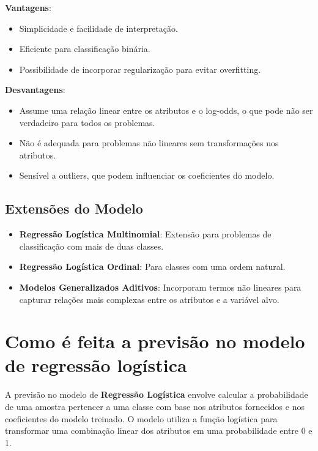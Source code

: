 \documentclass{sciposter}
\begin{document}
\begin{multicols}{3}
\textbf{Vantagens}:

\begin{itemize}
    \item Simplicidade e facilidade de interpretação.
    \item Eficiente para classificação binária.
    \item Possibilidade de incorporar regularização para evitar overfitting.
\end{itemize}

\textbf{Desvantagens}:

\begin{itemize}
    \item Assume uma relação linear entre os atributos e o log-odds, o que pode não ser verdadeiro para todos os problemas.
    \item Não é adequada para problemas não lineares sem transformações nos atributos.
    \item Sensível a outliers, que podem influenciar os coeficientes do modelo.
\end{itemize}

\subsection{Extensões do Modelo}

\begin{itemize}
    \item \textbf{Regressão Logística Multinomial}: Extensão para problemas de classificação com mais de duas classes.
    \item \textbf{Regressão Logística Ordinal}: Para classes com uma ordem natural.
    \item \textbf{Modelos Generalizados Aditivos}: Incorporam termos não lineares para capturar relações mais complexas entre os atributos e a variável alvo.
\end{itemize}

\section{Como é feita a previsão no modelo de regressão logística}

A previsão no modelo de \textbf{Regressão Logística} envolve calcular a probabilidade de uma amostra pertencer a uma classe com base nos atributos fornecidos e nos coeficientes do modelo treinado. O modelo utiliza a função logística para transformar uma combinação linear dos atributos em uma probabilidade entre 0 e 1.


\end{multicols}
\end{document}
